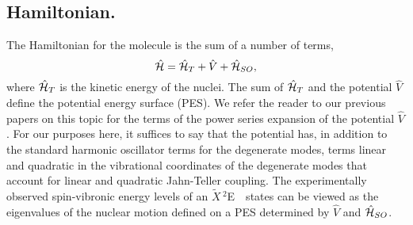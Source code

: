 \documentclass{article}
\newcommand{\XtildeE}{$\widetilde{X}\,^2$E\ }
\begin{document}
\subsection{Hamiltonian.} The Hamiltonian for the molecule is the sum of a number of terms, 
\begin{equation}
\hat{\cal H}=\hat{\cal H}_{T}+\hat{V}+\hat{\cal H}_{SO},
\label{overall Hamiltonian}
\end{equation}
where $\hat{\cal H}_{T}$ is the kinetic energy of the nuclei. 
The sum of $\hat{\cal H}_T$ and the potential $\hat{V}$ define
the potential energy surface (PES). We refer the reader to our 
previous papers\cite{c6f6review,tab4} on this topic for the
terms of the power series expansion of the potential 
$\hat{V}$. For our
purposes here, it suffices to say that the potential has, in addition
to the standard harmonic oscillator terms for the degenerate modes,
terms linear and quadratic in the vibrational coordinates of the
degenerate modes that account
for linear and quadratic Jahn-Teller coupling. 
The experimentally observed spin-vibronic energy levels of an \XtildeE\
states can be viewed as the eigenvalues of the nuclear
motion defined on a PES determined by $\hat{V}$ and $\hat{\cal H}_{SO}$.
\end{document}
